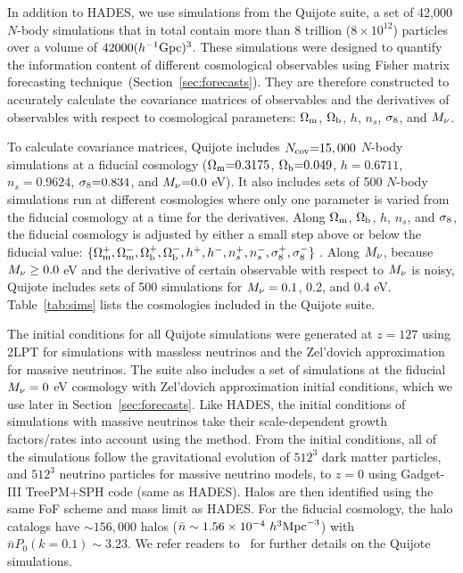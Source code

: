 In addition to HADES, we use simulations from the Quijote suite, a
set of 42,000 $N$-body simulations that in total contain more than 8 trillion 
($8\times10^{12}$) particles over a volume of $42000 (h^{-1}{\rm Gpc})^3$. 
These simulations were designed to quantify the information content of 
different cosmological observables using Fisher matrix forecasting 
technique~(Section~\ref{sec:forecasts}). They are therefore constructed to accurately 
calculate the covariance matrices of observables and the derivatives of observables with 
respect to cosmological parameters: 
$\Omega_{\rm m}$, $\Omega_{\rm b}$, $h$, $n_s$, $\sigma_8$, and $M_\nu$.

To calculate covariance matrices, Quijote includes $N_{\rm cov}{=}15,000$ $N$-body 
simulations at a fiducial cosmology ($\Omega_{\rm m}{=}0.3175$, $\Omega_{\rm b}{=}0.049$, $h{=}0.6711$, 
$n_s{=}0.9624$, $\sigma_8{=}0.834$, and $M_\nu{=}0.0$ eV). It also includes sets 
of 500 $N$-body simulations run at different cosmologies where only one parameter 
is varied from the fiducial cosmology at a time for the derivatives. Along $\Omega_{\rm m}$, 
$\Omega_{\rm b}$, $h$, $n_s$, and $\sigma_8$, the fiducial cosmology is adjusted by either a 
small step above or below the fiducial value: 
$\{\Omega_{\rm m}^{+}, \Omega_{\rm m}^{-}, \Omega_{\rm b}^{+}, \Omega_{\rm b}^{-}, h^+, h^-, n_s^{+}, n_s^{-}, \sigma_8^{+}, \sigma_8^-\}$ . 
Along $M_\nu$, because $M_\nu \ge 0.0$ eV and the derivative of certain observable 
with respect to $M_\nu$ is noisy, Quijote includes sets of 500 simulations for 
$M_\nu = 0.1$, 0.2, and 0.4 eV. Table~\ref{tab:sims} lists the cosmologies included 
in the Quijote suite. 

The initial conditions for all Quijote simulations were generated at $z=127$ using 
2LPT for simulations with massless neutrinos and the Zel’dovich approximation for 
massive neutrinos. The suite also includes a set of simulations at the fiducial 
$M_\nu = 0$ eV cosmology with Zel'dovich approximation initial conditions, which 
we use later in Section~\ref{sec:forecasts}. Like HADES, the initial conditions 
of simulations with massive neutrinos take their scale-dependent growth factors/rates 
into account using the \cite{zennaro2017a} method. From the initial conditions, all 
of the simulations follow the gravitational evolution of $512^3$ dark matter particles, 
and $512^3$ neutrino particles for massive neutrino models, to $z=0$ using {\sc Gadget-III}
TreePM+SPH code (same as HADES). Halos are then identified using the same FoF 
scheme and mass limit as HADES. For the fiducial cosmology, the halo catalogs 
have ${\sim}156,000$ halos ($\bar{n} \sim 1.56 \times 10^{-4}~h^3{\rm Mpc}^{-3}$) 
with $\bar{n} P_0(k=0.1)\sim 3.23$.
We refer readers to~\cite{villaescusa-navarro2019} for further details on the Quijote simulations.

